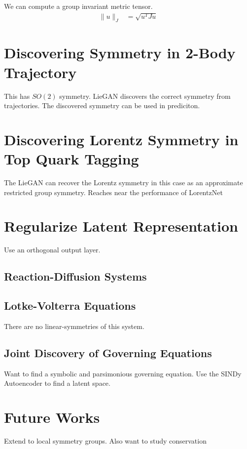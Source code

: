 \documentclass[book.tex]{subfiles}
\begin{document}
We can compute a group invariant metric tensor.
\begin{align}
    \|u\|_J &= \sqrt{u^T J u}
\end{align}

\section{Discovering Symmetry in 2-Body Trajectory}

This has $SO(2)$ symmetry. LieGAN discovers the correct symmetry from trajectories. The discovered symmetry can be used in prediciton.

\section{Discovering Lorentz Symmetry in Top Quark Tagging}

The LieGAN can recover the Lorentz symmetry in this case as an approximate restricted group symmetry. Reaches near the performance of LorentzNet

\section{Regularize Latent Representation}

Use an orthogonal output layer.

\subsection{Reaction-Diffusion Systems}

\subsection{Lotke-Volterra Equations}
There are no linear-symmetries of this system.

\subsection{Joint Discovery of Governing Equations}

Want to find a symbolic and parsimonious governing equation. Use the SINDy Autoencoder to find a latent space.

\section{Future Works}

Extend to local symmetry groups. Also want to study conservation
\end{document}
